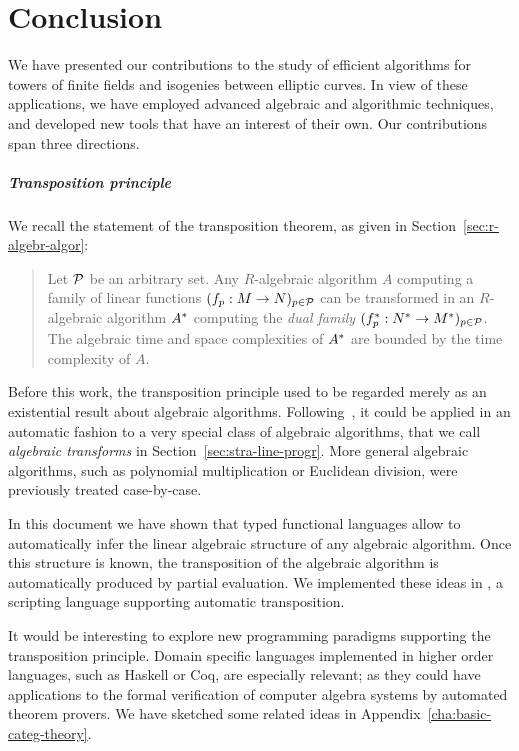 \chapter{Conclusion}

We have presented our contributions to the study of efficient
algorithms for towers of finite fields and isogenies between elliptic
curves. In view of these applications, we have employed advanced
algebraic and algorithmic techniques, and developed new tools that
have an interest of their own. Our contributions span three directions.

\paragraph{Transposition principle}
We recall the statement of the transposition theorem, as given in
Section~\ref{sec:r-algebr-algor}:
\begin{quote}
  Let $\mathcal{P}$ be an arbitrary set. Any $R$-algebraic algorithm $A$
  computing a family of linear functions $(f_p:M\rightarrow N)_{p\in\mathcal{P}}$
  can be transformed in an $R$-algebraic algorithm $A^\ast$
  computing the \emph{dual family}
  $(f^\ast_p:N^\ast\rightarrow M^\ast)_{p\in\mathcal{P}}$. The algebraic time
  and space complexities of $A^\ast$ are bounded by the time
  complexity of $A$.
\end{quote}

Before this work, the transposition principle used to be regarded
merely as an existential result about algebraic algorithms.
Following~\cite{bostan+lecerf+schost:tellegen}, it could be applied in
an automatic fashion to a very special class of algebraic algorithms,
that we call \emph{algebraic transforms} in
Section~\ref{sec:stra-line-progr}. More general algebraic algorithms,
such as polynomial multiplication or Euclidean division, were
previously treated case-by-case.

In this document we have shown that typed functional languages allow
to automatically infer the linear algebraic structure of any algebraic
algorithm. Once this structure is known, the transposition of the
algebraic algorithm is automatically produced by partial
evaluation. We implemented these ideas in \tALpy{}, a scripting
language supporting automatic transposition.

It would be interesting to explore new programming paradigms
supporting the transposition principle. Domain specific languages
implemented in higher order languages, such as Haskell or Coq, are
especially relevant; as they could have applications to the formal
verification of computer algebra systems by automated theorem provers.
We have sketched some related ideas in
Appendix~\ref{cha:basic-categ-theory}.


